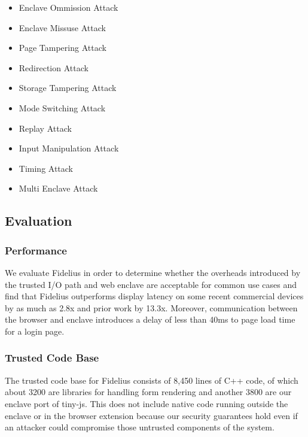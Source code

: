 \documentclass{article}
\begin{document}
\begin{itemize}
\item Enclave Ommission Attack
\item Enclave Missuse Attack
\item Page Tampering Attack
\item Redirection Attack
\item Storage Tampering Attack
\item Mode Switching Attack
\item Replay Attack
\item Input Manipulation Attack
\item Timing Attack
\item Multi Enclave Attack
\end{itemize}

\subsection{Evaluation}

\subsubsection{Performance}

We evaluate Fidelius in order to determine whether the overheads introduced by the trusted I/O path and web enclave are acceptable for common use cases and find that Fidelius outperforms display latency on some recent commercial devices by as much as 2.8x and prior work by 13.3x. Moreover, communication between the browser and enclave introduces a delay of less than 40ms to page load time for a login page.

\subsubsection{Trusted Code Base}

The trusted code base for Fidelius consists of 8,450 lines of C++ code, of which about 3200 are libraries for handling form rendering and another 3800 are our enclave port of tiny-js. This does not include native code running outside the enclave or in the browser extension because our security guarantees hold even if an attacker could compromise those untrusted components of the system.
\end{document}
